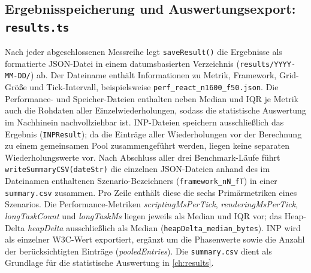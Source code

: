 \subsection{Ergebnisspeicherung und Auswertungsexport: \texttt{results.ts}}
\label{ss:impl-results}

Nach jeder abgeschlossenen Messreihe legt \texttt{saveResult()} die Ergebnisse als formatierte JSON-Datei in einem datumsbasierten Verzeichnis (\texttt{results/YYYY-MM-DD/}) ab. Der Dateiname enthält Informationen zu Metrik, Framework, Grid-Größe und Tick-Intervall, beispielsweise \texttt{perf\_react\_n1600\_f50.json}. Die Performance- und Speicher-Dateien enthalten neben Median und IQR je Metrik auch die Rohdaten aller Einzelwiederholungen, sodass die statistische Auswertung im Nachhinein nachvollziehbar ist. INP-Dateien speichern ausschließlich das Ergebnis (\texttt{INPResult}); da die Einträge aller Wiederholungen vor der Berechnung zu einem gemeinsamen Pool zusammengeführt werden, liegen keine separaten Wiederholungswerte vor. Nach Abschluss aller drei Benchmark-Läufe führt \texttt{writeSummaryCSV(dateStr)} die einzelnen JSON-Dateien anhand des im Dateinamen enthaltenen Szenario-Bezeichners (\texttt{framework\_nN\_fT}) in einer \texttt{summary.csv} zusammen. Pro Zeile enthält diese die sechs Primärmetriken eines Szenarios. Die Performance-Metriken \textit{scriptingMsPerTick}, \textit{renderingMsPerTick}, \textit{longTaskCount} und \textit{longTaskMs} liegen jeweils als Median und IQR vor; das Heap-Delta \textit{heapDelta} ausschließlich als Median (\texttt{heapDelta\_median\_bytes}). INP wird als einzelner W3C-Wert exportiert, ergänzt um die Phasenwerte sowie die Anzahl der berücksichtigten Einträge (\textit{pooledEntries}). Die \texttt{summary.csv} dient als Grundlage für die statistische Auswertung in \cref{ch:results}.
